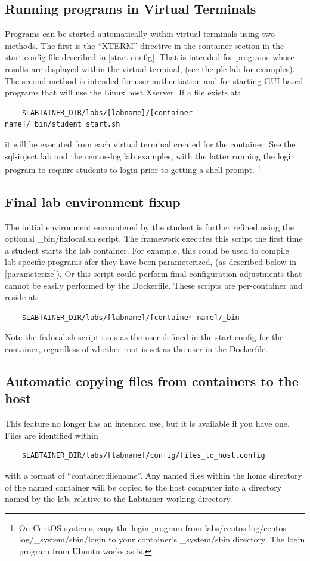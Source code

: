 \documentclass[12pt]{article}
\begin{document}
\subsection {Running programs in Virtual Terminals}
\label {student start}
Programs can be started automatically within virtual terminals using two methods.
The first is the ``XTERM'' directive in the container section in the start.config file
described in \ref{start config}.  That is intended for programs whose results are displayed
within the virtual terminal, (see the plc lab for examples).  The second method is 
intended for user authentiation and for starting GUI based programs
that will use the Linux host Xserver.  If a file exists at:
\begin{verbatim}
    $LABTAINER_DIR/labs/[labname]/[container name]/_bin/student_start.sh
\end{verbatim}
it will be executed from each virtual terminal created for the container.
See the sql-inject lab and the centos-log lab examples, with the latter
running the login program to require students to login prior to getting a shell prompt.
\footnote{On CentOS systems, copy the login program from labs/centos-log/centos-log/\_system/sbin/login
to your container's \_system/sbin directory. The login program from Ubuntu works as is.}


\subsection{Final lab environment fixup}
The initial environment encountered by the student is further refined using
the optional \_bin/fixlocal.sh script.  The framework executes
this script the first time a student starts the lab container.  For example,
this could be used to compile lab-specific programs afer they have been parameterized,
(as described below in \ref{parameterize}).  Or this script could perform final configuration adjustments
that cannot be easily performed by the Dockerfile.  These scripts are per-container
and reside at:
\begin{verbatim}
    $LABTAINER_DIR/labs/[labname]/[container name]/_bin
\end{verbatim}
\noindent Note the fixlocal.sh script runs as the user defined in the start.config for the container, 
regardless of whether root is set as the user in the Dockerfile.

\subsection{Automatic copying files from containers to the host}
This feature no longer has an intended use, but it is available if you have one.
Files are identified within
\begin{verbatim}
    $LABTAINER_DIR/labs/[labname]/config/files_to_host.config
\end{verbatim}
\noindent with a format of ``container:filename''.  Any named files within the home directory of
the named container will be copied to the host computer into a directory named by the lab, relative
to the Labtainer working directory.
\end{document}
